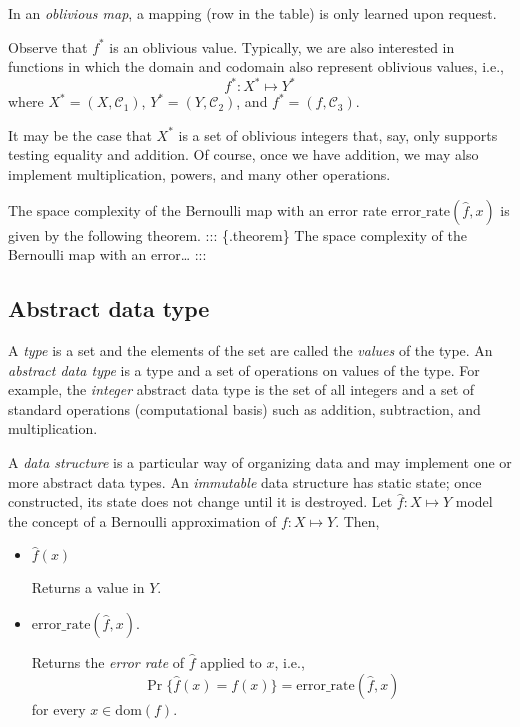 \documentclass[
  letterpaper,
  DIV=11,
  numbers=noendperiod]{scrartcl}
\theoremstyle{remark}
\begin{document}
In an \emph{oblivious map}, a mapping (row in the table) is only learned
upon request.

Observe that \(f^*\) is an oblivious value. Typically, we are also
interested in functions in which the domain and codomain also represent
oblivious values, i.e., \[
f^* : X^* \mapsto Y^*
\] where \(X^* = (X,\mathcal{C}_1)\), \(Y^* = (Y,\mathcal{C}_2)\), and
\(f^* = (f,\mathcal{C}_3)\).

It may be the case that \(X^*\) is a set of oblivious integers that,
say, only supports testing equality and addition. Of course, once we
have addition, we may also implement multiplication, powers, and many
other operations.

The space complexity of the Bernoulli map with an error rate
\(\mathrm{error\_rate}(\hat{f}, x)\) is given by the following theorem.
::: \{.theorem\} The space complexity of the Bernoulli map with an
error\ldots{} :::

\subsection{Abstract data type}\label{abstract-data-type}

A \emph{type} is a set and the elements of the set are called the
\emph{values} of the type. An \emph{abstract data type} is a type and a
set of operations on values of the type. For example, the \emph{integer}
abstract data type is the set of all integers and a set of standard
operations (computational basis) such as addition, subtraction, and
multiplication.

A \emph{data structure} is a particular way of organizing data and may
implement one or more abstract data types. An \emph{immutable} data
structure has static state; once constructed, its state does not change
until it is destroyed. Let \(\hat{f} : X \mapsto Y\) model the concept
of a Bernoulli approximation of \(f : X \mapsto Y\). Then,

\begin{itemize}
\item
  \(\hat{f}(x)\)

  Returns a value in \(Y\).
\item
  \(\mathrm{error\_rate}(\hat{f},x)\).

  Returns the \emph{error rate} of \(\hat{f}\) applied to \(x\), i.e.,
  \[
      \Pr\{\hat{f}(x) = f(x)\} = \mathrm{error\_rate}(\hat{f},x)
  \] for every \(x \in \mathrm{dom}(f)\).
\end{itemize}
\end{document}
